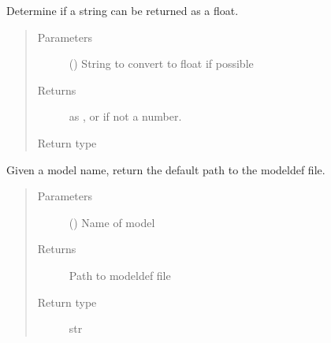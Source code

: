 \documentclass[letterpaper,10pt,english]{sphinxmanual}
\begin{document}
\begin{fulllineitems}
\label{\detokenize{jsonParsing:bayescmd.jsonParsing.modelJSON.float_or_str}}
Determine if a string can be returned as a float.
\begin{quote}\begin{description}
\item[{Parameters}] \leavevmode
{} () \textendash{} String to convert to float if possible

\item[{Returns}] \leavevmode
{} \textendash{}  as , or  if not a number.

\item[{Return type}] \leavevmode
{}

\end{description}\end{quote}

\end{fulllineitems}


\begin{fulllineitems}
\label{\detokenize{jsonParsing:bayescmd.jsonParsing.modelJSON.getDefaultFilePath}}
Given a model name, return the default path to the modeldef file.
\begin{quote}\begin{description}
\item[{Parameters}] \leavevmode
{} () \textendash{} Name of model

\item[{Returns}] \leavevmode
{} \textendash{} Path to modeldef file

\item[{Return type}] \leavevmode
str

\end{description}\end{quote}

\end{fulllineitems}

\end{document}
